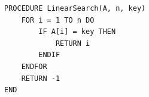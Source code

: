 
\begin{lstlisting}[style=pseudocode]
PROCEDURE LinearSearch(A, n, key)
    FOR i = 1 TO n DO
        IF A[i] = key THEN
            RETURN i
        ENDIF
    ENDFOR
    RETURN -1
END
\end{lstlisting}
